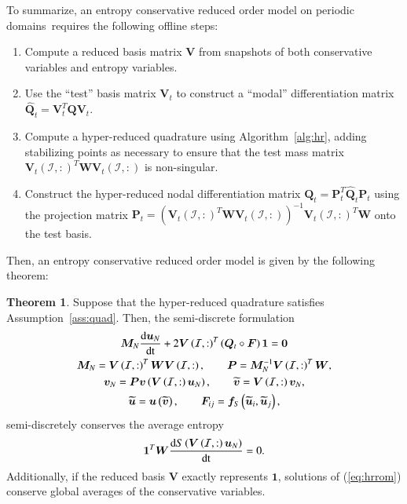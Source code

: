 \documentclass[preprint,10pt]{elsarticle}
\theoremstyle{definition}
\theoremstyle{lemma}
\theoremstyle{theorem}
\newtheorem{theorem}{Theorem}
\theoremstyle{assumption}
\renewcommand{\hat}{\widehat}
\renewcommand{\tilde}{\widetilde}
\newcommand{\td}[2]{\frac{{\rm d}#1}{{\rm d}{\rm #2}}}
\newcommand{\LRp}[1]{\left( #1 \right)}
\begin{document}
To summarize, an entropy conservative reduced order model on periodic domains requires the following offline steps:
\begin{enumerate}
\item Compute a reduced basis matrix $\bm{V}$ from snapshots of both conservative variables and entropy variables.  
\item Use the ``test'' basis matrix $\bm{V}_t$ to construct a ``modal'' differentiation matrix $\hat{\bm{Q}}_t = \bm{V}_t^T\bm{Q}\bm{V}_t$.
\item Compute a hyper-reduced quadrature using Algorithm~\ref{alg:hr}, adding stabilizing points as necessary to ensure that the test mass matrix $\bm{V}_t\LRp{\mathcal{I},:}^T\bm{W}\bm{V}_t\LRp{\mathcal{I},:}$ is non-singular.  
\item Construct the hyper-reduced nodal differentiation matrix $\bm{Q}_t = \bm{P}_t^T\hat{\bm{Q}}_t\bm{P}_t$ using the projection matrix $\bm{P}_t = \LRp{\bm{V}_t\LRp{\mathcal{I},:}^T\bm{W}\bm{V}_t\LRp{\mathcal{I},:}}^{-1}\bm{V}_t\LRp{\mathcal{I},:}^T\bm{W}$ onto the test basis.
\end{enumerate}
Then, an entropy conservative reduced order model is given by the following theorem:
\begin{theorem}
Suppose that the hyper-reduced quadrature satisfies Assumption~\ref{ass:quad}.  Then, the semi-discrete formulation 
\begin{gather}
\bm{M}_N\td{\bm{u}_N}{t} + 2\bm{V}\LRp{\mathcal{I},:}^T\LRp{\bm{Q}_t \circ \bm{F}}\bm{1} = \bm{0} \label{eq:hrrom}\\
\bm{M}_N = \bm{V}\LRp{\mathcal{I},:}^T\bm{W}\bm{V}\LRp{\mathcal{I},:}, \qquad \bm{P} = \bm{M}_N^{-1}\bm{V}\LRp{\mathcal{I},:}^T\bm{W},\nonumber\\ 
\bm{v}_N = \bm{P}\bm{v}\LRp{\bm{V}\LRp{\mathcal{I},:}\bm{u}_N}, \qquad \tilde{\bm{v}} = \bm{V}\LRp{\mathcal{I},:}\bm{v}_N, \nonumber\\
\tilde{\bm{u}} = \bm{u}\LRp{\tilde{\bm{v}}}, \qquad \bm{F}_{ij} = \bm{f}_S\LRp{\tilde{\bm{u}}_i,\tilde{\bm{u}}_j},\nonumber
\end{gather}
semi-discretely conserves the average entropy 
\[
\bm{1}^T\bm{W}\td{S\LRp{\bm{V}\LRp{\mathcal{I},:}\bm{u}_N}}{t} = 0.  
\]
Additionally, if the reduced basis $\bm{V}$ exactly represents $\bm{1}$, solutions of (\ref{eq:hrrom}) conserve global averages of the conservative variables.
\label{thm:hrromes}
\end{theorem}
\end{document}
